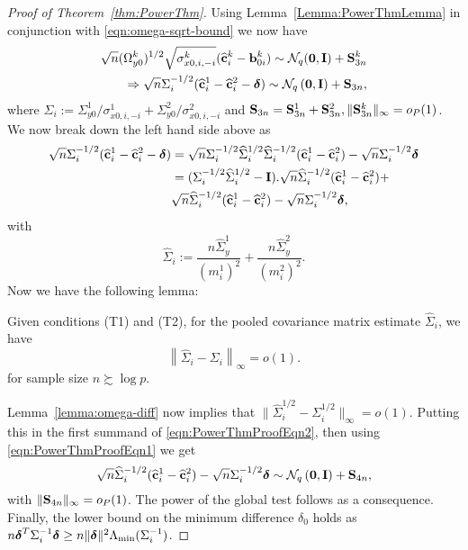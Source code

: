 \begin{proof}[Proof of Theorem~\ref{thm:PowerThm}]
Using Lemma~\ref{Lemma:PowerThmLemma} in conjunction with \eqref{eqn:omega-sqrt-bound} we now have
%
\begin{align}
\sqrt n (\Omega_{y0}^k)^{1/2} \sqrt{\sigma_{x0,i,-i}^k} (\widehat {{\bf{c}}}_i^k - {\bf{b}}_{0i}^k)  \sim
{\cal{N}}_q ( {\bf 0}, {\mathbf{I}}) + {\mathbf{S}}_{3n}^k \notag\\
\Rightarrow \sqrt n \Sigma_i^{-1/2} (\widehat {{\bf{c}}}_i^1 - \widehat {{\bf{c}}}_i^2 - {\boldsymbol{\delta}}) \sim
{\cal{N}}_q \left( {\bf 0}, {\mathbf{I}} \right) + {\mathbf{S}}_{3n},
\label{eqn:PowerThmProofEqn1}
\end{align}
%
where $\Sigma_i := \Sigma_{y0}^1/ \sigma_{x0,i,-i}^1 + \Sigma_{y0}^2/ \sigma_{x0,i,-i}^2$ and ${\mathbf{S}}_{3n} = {\mathbf{S}}_{3n}^1 + {\mathbf{S}}_{3n}^2, \|{\mathbf{S}}_{3n}^k\|_\infty = o_P(1)$. We now break down the left hand side above as
%
\begin{align}
\sqrt n \Sigma_i^{-1/2} (\widehat {{\bf{c}}}_i^1 - \widehat {{\bf{c}}}_i^2 - {\boldsymbol{\delta}}) &=
\sqrt n \Sigma_i^{-1/2} \widehat \Sigma_i^{1/2} \widehat \Sigma_i^{-1/2} (\widehat {{\bf{c}}}_i^1 - \widehat {{\bf{c}}}_i^2) - \sqrt n \Sigma_i^{-1/2} {\boldsymbol{\delta}} \notag\\
&= (\Sigma_i^{-1/2} \widehat \Sigma_i^{1/2} - {\mathbf{I}}) . \sqrt n \widehat \Sigma_i^{-1/2} (\widehat {{\bf{c}}}_i^1 - \widehat {{\bf{c}}}_i^2) + \notag\\
& \sqrt n \widehat \Sigma_i^{-1/2} (\widehat {{\bf{c}}}_i^1 - \widehat {{\bf{c}}}_i^2) - \sqrt n \Sigma_i^{-1/2} {\boldsymbol{\delta}},
\label{eqn:PowerThmProofEqn2}
\end{align}
%
with
%
$$
\widehat \Sigma_i :=
\frac{ n \widehat \Sigma_y^1}{(m_i^1)^2} + \frac{n \widehat \Sigma_y^2}{(m_i^2)^2}.
$$
%
Now we have the following lemma:
%
\begin{Lemma}\label{Lemma:PowerThmLemma2}
Given conditions (T1) and (T2), for the pooled covariance matrix estimate $\widehat \Sigma_i$, we have
%
$$
\left\| \widehat \Sigma_i - \Sigma_i \right\|_\infty = o(1).
$$
%
for sample size $n \succsim \log p$.
\end{Lemma}
%
Lemma~\ref{lemma:omega-diff} now implies that $\| \widehat \Sigma_i^{1/2} - \Sigma_i^{1/2} \|_\infty = o(1)$. Putting this in the first summand of \eqref{eqn:PowerThmProofEqn2}, then using \eqref{eqn:PowerThmProofEqn1} we get
%
$$
\sqrt n \widehat \Sigma_i^{-1/2} (\widehat {{\bf{c}}}_i^1 - \widehat {{\bf{c}}}_i^2) - \sqrt n \Sigma_i^{-1/2} {\boldsymbol{\delta}}
\sim {\cal{N}}_q \left( {\bf 0}, {\mathbf{I}} \right) + {\mathbf{S}}_{4n},
$$
%
with $\| {\mathbf{S}}_{4n} \|_\infty = o_P(1)$. The power of the global test follows as a consequence. Finally, the lower bound on the minimum difference $\delta_0$ holds as $n {\boldsymbol{\delta}}^T \Sigma_i^{-1} {\boldsymbol{\delta}} \geq n \| {\boldsymbol{\delta}} \|^2 \Lambda_{\min} (\Sigma_i^{-1}) $.
\end{proof}

